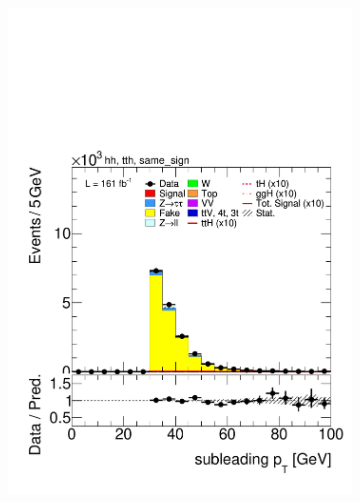 \begin{figure}[htbp]
  \begin{subfigure}[b]{0.45\textwidth}
    \centering
    \includegraphics[width=\textwidth]{images/same_sign_same_sign_run3/plot_tau_1_pt_hh_tth_22_23_24_same_sign.pdf}
    \caption{}
  \end{subfigure}
  \hfill
  \begin{subfigure}[b]{0.45\textwidth}
    \centering

\end{subfigure}
\end{figure}
